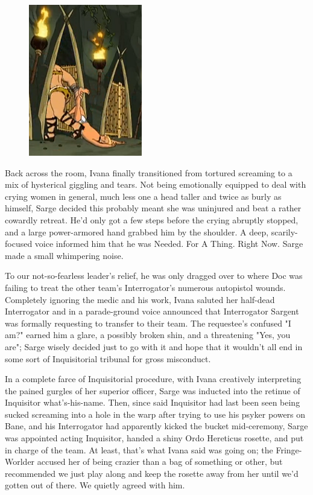 \begin{figure}
	\begin{center}
		\includegraphics[width=\figwidth]{pics/19/4.png}
	\end{center}
\end{figure}
Back across the room, Ivana finally transitioned from tortured screaming to a mix of hysterical giggling and tears. 
Not being emotionally equipped to deal with crying women in general, much less one a head taller and twice as burly as himself, Sarge decided this probably meant she was uninjured and beat a rather cowardly retreat. 
He'd only got a few steps before the crying abruptly stopped, and a large power-armored hand grabbed him by the shoulder. 
A deep, scarily-focused voice informed him that he was Needed. 
For A Thing. 
Right Now. 
Sarge made a small whimpering noise.

To our not-so-fearless leader's relief, he was only dragged over to where Doc was failing to treat the other team's Interrogator's numerous autopistol wounds. 
Completely ignoring the medic and his work, Ivana saluted her half-dead Interrogator and in a parade-ground voice announced that Interrogator Sargent was formally requesting to transfer to their team. 
The requestee's confused "I am?" earned him a glare, a possibly broken shin, and a threatening "Yes, you are"; 
Sarge wisely decided just to go with it and hope that it wouldn't all end in some sort of Inquisitorial tribunal for gross misconduct.

In a complete farce of Inquisitorial procedure, with Ivana creatively interpreting the pained gurgles of her superior officer, Sarge was inducted into the retinue of Inquisitor what's-his-name. 
Then, since said Inquisitor had last been seen being sucked screaming into a hole in the warp after trying to use his psyker powers on Bane, and his Interrogator had apparently kicked the bucket mid-ceremony, Sarge was appointed acting Inquisitor, handed a shiny Ordo Hereticus rosette, and put in charge of the team. 
At least, that's what Ivana said was going on; 
the Fringe-Worlder accused her of being crazier than a bag of something or other, but recommended we just play along and keep the rosette away from her until we'd gotten out of there. 
We quietly agreed with him.

